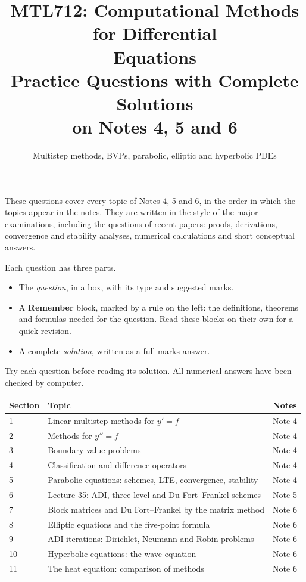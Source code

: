 \documentclass[11pt,a4paper]{article}
\title{\textbf{MTL712: Computational Methods for Differential\\Equations}\\[6pt]
\large Practice Questions with Complete Solutions\\
on Notes 4, 5 and 6}
\author{\normalsize Multistep methods, BVPs, parabolic, elliptic and
hyperbolic PDEs}
\date{}
\begin{document}
\maketitle
\thispagestyle{plain}

These questions cover every topic of Notes 4, 5 and 6, in the order in
which the topics appear in the notes.  They are written in the style
of the major examinations, including the questions of recent papers:
proofs, derivations, convergence and stability analyses, numerical
calculations and short conceptual answers.

Each question has three parts.
\begin{itemize}
  \item The \emph{question}, in a box, with its type and suggested
    marks.
  \item A \textbf{Remember} block, marked by a rule on the left: the
    definitions, theorems and formulas needed for the question.  Read
    these blocks on their own for a quick revision.
  \item A complete \emph{solution}, written as a full-marks answer.
\end{itemize}
Try each question before reading its solution.  All numerical answers
have been checked by computer.

\begin{center}
\renewcommand{\arraystretch}{1.25}
\begin{tabular}{@{}lll@{}}
\toprule
Section & Topic & Notes\\
\midrule
1 & Linear multistep methods for \(y'=f\) & Note 4\\
2 & Methods for \(y''=f\) & Note 4\\
3 & Boundary value problems & Note 4\\
4 & Classification and difference operators & Note 4\\
5 & Parabolic equations: schemes, LTE, convergence, stability & Note 4\\
6 & Lecture 35: ADI, three-level and Du Fort--Frankel schemes & Note 5\\
7 & Block matrices and Du Fort--Frankel by the matrix method & Note 6\\
8 & Elliptic equations and the five-point formula & Note 6\\
9 & ADI iterations: Dirichlet, Neumann and Robin problems & Note 6\\
10 & Hyperbolic equations: the wave equation & Note 6\\
11 & The heat equation: comparison of methods & Note 6\\
\bottomrule
\end{tabular}
\end{center}
\end{document}
